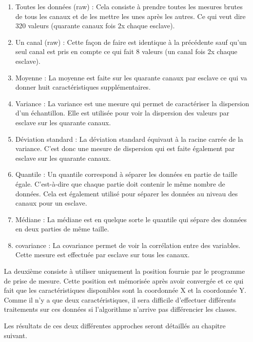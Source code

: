 \begin{enumerate}
 \item Toutes les données (raw) : Cela consiste à prendre toutes les mesures brutes de tous les canaux et de les mettre les unes après les autres. Ce qui veut dire 320 valeurs (quarante canaux fois 2x chaque esclave).
 \item Un canal (raw) : Cette façon de faire est identique à la précédente sauf qu'un seul canal est pris en compte ce qui fait 8 valeurs (un canal fois 2x chaque esclave).
 \item Moyenne : La moyenne est faite sur les quarante canaux par esclave ce qui va donner huit caractéristiques supplémentaires.
 \item Variance : La variance est une mesure qui permet de caractériser la dispersion d'un échantillon. Elle est utilisée pour voir la dispersion des valeurs par esclave sur les quarante canaux. 
 \item Déviation standard : La déviation standard équivaut à la racine carrée de la variance. C'est donc une mesure de dispersion qui est faite également par esclave sur les quarante canaux. 
 \item Quantile : Un quantile correspond à séparer les données en partie de taille égale. C'est-à-dire que chaque partie doit contenir le même nombre de données. Cela est également utilisé pour séparer les données au niveau des canaux pour un esclave.
 \item Médiane : La médiane est en quelque sorte le quantile qui sépare des données en deux parties de même taille. 
 \item covariance : La covariance permet de voir la corrélation entre des variables. Cette mesure est effectuée par esclave sur tous les canaux.  
\end{enumerate}
 
La deuxième consiste à utiliser uniquement la position fournie par le programme de prise de mesure. Cette position est mémorisée après avoir convergée et ce qui fait que les caractéristiques disponibles sont la coordonnée X et la coordonnée Y. Comme il n'y a que deux caractéristiques, il sera difficile d'effectuer différents traitements sur ces données si l'algorithme n'arrive pas différencier les classes. 

Les résultats de ces deux différentes approches seront détaillés au chapitre suivant. 

